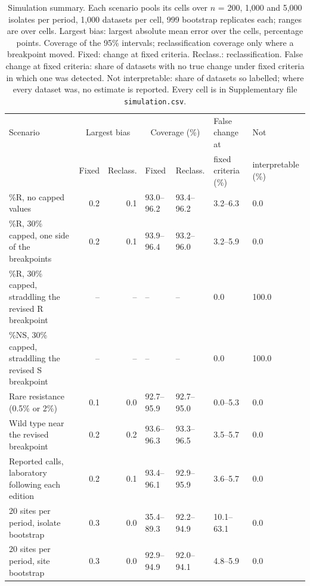 \begin{table}[h]
\centering
\scriptsize
\setlength{\tabcolsep}{4pt}
\begin{tabular}{lrrllll}
\toprule
Scenario & \multicolumn{2}{c}{Largest bias} & \multicolumn{2}{c}{Coverage (\%)} & False change at & Not \\
 & Fixed & Reclass. & Fixed & Reclass. & fixed criteria (\%) & interpretable (\%) \\
\midrule
\%R, no capped values & 0.2 & 0.1 & 93.0--96.2 & 93.4--96.2 & 3.2--6.3 & 0.0 \\
\%R, 30\% capped, one side of the breakpoints & 0.2 & 0.1 & 93.9--96.4 & 93.2--96.0 & 3.2--5.9 & 0.0 \\
\%R, 30\% capped, straddling the revised R breakpoint & -- & -- & -- & -- & 0.0 & 100.0 \\
\%NS, 30\% capped, straddling the revised S breakpoint & -- & -- & -- & -- & 0.0 & 100.0 \\
Rare resistance (0.5\% or 2\%) & 0.1 & 0.0 & 92.7--95.9 & 92.7--95.0 & 0.0--5.3 & 0.0 \\
Wild type near the revised breakpoint & 0.2 & 0.2 & 93.6--96.3 & 93.3--96.5 & 3.5--5.7 & 0.0 \\
Reported calls, laboratory following each edition & 0.2 & 0.1 & 93.4--96.1 & 92.9--95.9 & 3.6--5.7 & 0.0 \\
20 sites per period, isolate bootstrap & 0.3 & 0.0 & 35.4--89.3 & 92.2--94.9 & 10.1--63.1 & 0.0 \\
20 sites per period, site bootstrap & 0.3 & 0.0 & 92.9--94.9 & 92.0--94.1 & 4.8--5.9 & 0.0 \\
\bottomrule
\end{tabular}
\caption{Simulation summary. Each scenario pools its cells over $n$ = 200, 1,000 and 5,000 isolates per period, 1,000 datasets per cell, 999 bootstrap replicates each; ranges are over cells. Largest bias: largest absolute mean error over the cells, percentage points. Coverage of the 95\% intervals; reclassification coverage only where a breakpoint moved. Fixed: change at fixed criteria. Reclass.: reclassification. False change at fixed criteria: share of datasets with no true change under fixed criteria in which one was detected. Not interpretable: share of datasets so labelled; where every dataset was, no estimate is reported. Every cell is in Supplementary file \texttt{simulation.csv}.}
\label{tab:sim}
\end{table}
